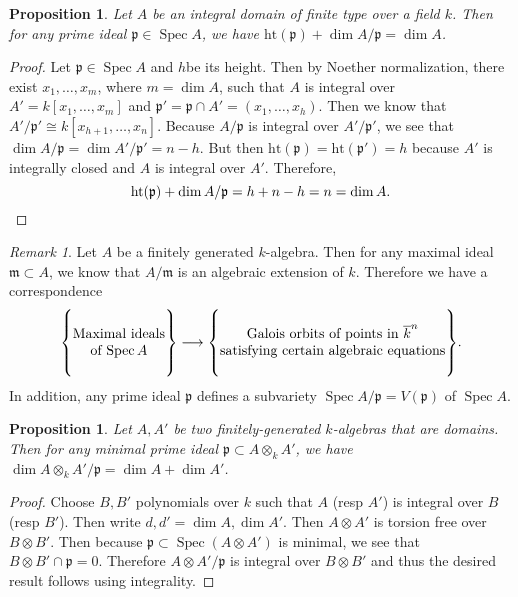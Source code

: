 \documentclass[leqno, openany]{memoir}
\newtheorem{prop}[thm]{Proposition}
\theoremstyle{definition}
\theoremstyle{remark}
\newtheorem{rmk}[thm]{Remark}
\theoremstyle{plain}
\theoremstyle{definition}
\theoremstyle{remark}
\newcommand{\mf}[1]{\mathfrak{#1}}
\newcommand{\mr}[1]{\mathrm{#1}}
\newcommand{\ol}[1]{\overline{#1}}
\DeclareMathOperator{\Spec}{Spec}
\begin{document}
\begin{prop} Let $A$ be an integral domain of finite type over a field $k$.
Then for any prime ideal $\mf{p} \in \Spec A$, we have $\mr{ht}(\mf{p}) + \dim
A/\mf{p} = \dim A$.  \end{prop}

\begin{proof} Let $\mf{p} \in \Spec A$ and $h$be its height. Then by Noether
    normalization, there exist $x_1, \ldots, x_m$, where $m = \dim A$, such
    that $A$ is integral over $A' = k[x_1, \ldots, x_m]$ and $\mf{p}' = \mf{p}
    \cap A' = (x_1, \ldots, x_h)$. Then we know that $A'/\mf{p}' \cong
    k[x_{h+1}, \ldots, x_n]$. Because $A/\mf{p}$ is integral over $A'/\mf{p}'$,
    we see that $\dim A/\mf{p} = \dim A'/\mf{p}' = n-h$. But then
    $\mr{ht}(\mf{p}) = \mr{ht}(\mf{p}') = h$ because $A'$ is integrally closed
    and $A$ is integral over $A'$. Therefore, \[ \mr{ht}(\mf{p}) + \dim
    A/\mf{p} = h + n-h = n = \dim A. \qedhere \] \end{proof}

\begin{rmk} Let $A$ be a finitely generated $k$-algebra. Then for any maximal
    ideal $\mf{m} \subset A$, we know that $A / \mf{m}$ is an algebraic
    extension of $k$. Therefore we have a correspondence \[ \qty{ \Centerstack{
    {Maximal ideals} {of $\Spec A$} } } \longrightarrow \qty{\Centerstack{
    {Galois orbits of points in $\ol{k}^n$} {satisfying certain algebraic
    equations} }}. \] In addition, any prime ideal $\mf{p}$ defines a
subvariety $\Spec A/\mf{p} = V(\mf{p})$ of $\Spec A$.  \end{rmk}

\begin{prop} Let $A,A'$ be two finitely-generated $k$-algebras that are
domains. Then for any minimal prime ideal $\mf{p} \subset A \otimes_k A'$, we
have $\dim A \otimes_k A' / \mf{p} = \dim A + \dim A'$.  \end{prop}

\begin{proof} Choose $B,B'$ polynomials over $k$ such that $A$ (resp $A'$) is
    integral over $B$ (resp $B'$). Then write $d,d' = \dim A, \dim A'$. Then $A
    \otimes A'$ is torsion free over $B \otimes B'$. Then because $\mf{p}
    \subset \Spec (A \otimes A')$ is minimal, we see that $B \otimes B' \cap
    \mf{p} = 0$. Therefore $A \otimes A' / \mf{p}$ is integral over $B \otimes
    B'$ and thus the desired result follows using integrality.  \end{proof}
\end{document}
